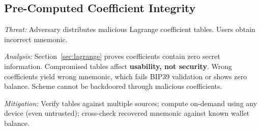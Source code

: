 \documentclass[11pt]{article}
\begin{document}
\subsection{Pre-Computed Coefficient Integrity}

\textit{Threat:} Adversary distributes malicious Lagrange coefficient tables. Users obtain incorrect mnemonic.

\textit{Analysis:} Section~\ref{sec:lagrange} proves coefficients contain zero secret information. Compromised tables affect \textbf{usability, not security}. Wrong coefficients yield wrong mnemonic, which fails BIP39 validation or shows zero balance. Scheme cannot be backdoored through malicious coefficients.

\textit{Mitigation:} Verify tables against multiple sources; compute on-demand using any device (even untrusted); cross-check recovered mnemonic against known wallet balance.
\end{document}
